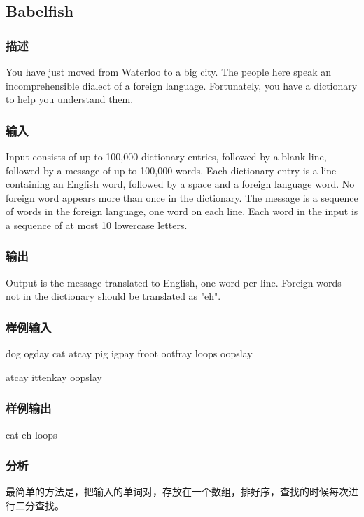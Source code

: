 \subsection{Babelfish}


\subsubsection{描述}
You have just moved from Waterloo to a big city. The people here speak an incomprehensible dialect of a foreign language. Fortunately, you have a dictionary to help you understand them.


\subsubsection{输入}
Input consists of up to 100,000 dictionary entries, followed by a blank line, followed by a message of up to 100,000 words. Each dictionary entry is a line containing an English word, followed by a space and a foreign language word. No foreign word appears more than once in the dictionary. The message is a sequence of words in the foreign language, one word on each line. Each word in the input is a sequence of at most 10 lowercase letters.


\subsubsection{输出}
Output is the message translated to English, one word per line. Foreign words not in the dictionary should be translated as "eh".


\subsubsection{样例输入}
\begin{Code}
dog ogday
cat atcay
pig igpay
froot ootfray
loops oopslay

atcay
ittenkay
oopslay
\end{Code}


\subsubsection{样例输出}
\begin{Code}
cat
eh
loops
\end{Code}


\subsubsection{分析}
最简单的方法是，把输入的单词对，存放在一个数组，排好序，查找的时候每次进行二分查找。

